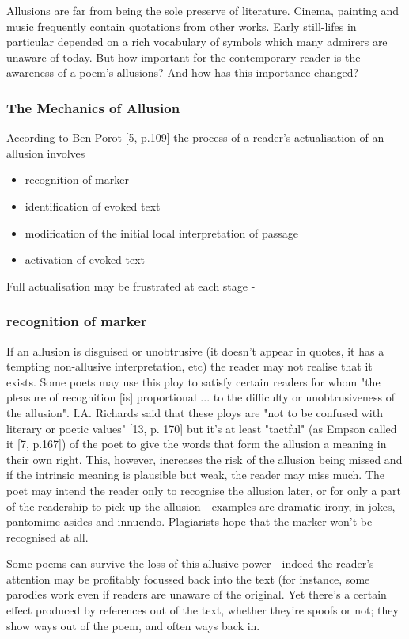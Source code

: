 \documentclass[11pt]{article}
\begin{document}
Allusions are far from being the sole preserve of literature. Cinema, painting and music frequently contain quotations from other works. Early still-lifes in particular depended on a rich vocabulary of symbols which many admirers are unaware of today. But how important for the contemporary reader is the awareness of a poem's allusions? And how has this importance changed?

\subsubsection*{The Mechanics of Allusion}

According to Ben-Porot [5, p.109] the process of a reader's actualisation of an allusion involves
\begin{itemize}
\item    recognition of marker
\item     identification of evoked text
 \item    modification of the initial local interpretation of passage
 \item    activation of evoked text
\end{itemize}
Full actualisation may be frustrated at each stage -

\subsubsection*{recognition of marker}

If an allusion is disguised or unobtrusive (it doesn't appear in quotes, it has a tempting non-allusive interpretation, etc) the reader may not realise that it exists. Some poets may use this ploy to satisfy certain readers for whom "the pleasure of recognition [is] proportional ... to the difficulty or unobtrusiveness of the allusion". I.A. Richards said that these ploys are "not to be confused with literary or poetic values" [13, p. 170] but it's at least "tactful" (as Empson called it [7, p.167]) of the poet to give the words that form the allusion a meaning in their own right. This, however, increases the risk of the allusion being missed and if the intrinsic meaning is plausible but weak, the reader may miss much. The poet may intend the reader only to recognise the allusion later, or for only a part of the readership to pick up the allusion - examples are dramatic irony, in-jokes, pantomime asides and innuendo. Plagiarists hope that the marker won't be recognised at all.

Some poems can survive the loss of this allusive power - indeed the reader's attention may be profitably focussed back into the text (for instance, some parodies work even if readers are unaware of the original. Yet there's a certain effect produced by references out of the text, whether they're spoofs or not; they show ways out of the poem, and often ways back in.
\end{document}
